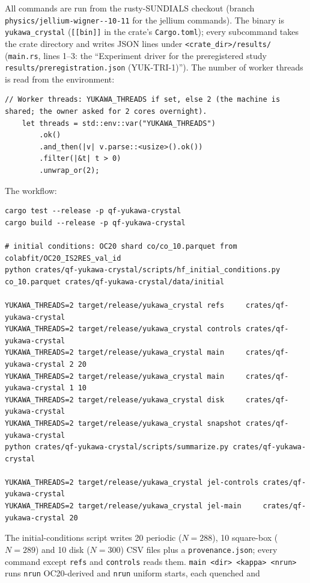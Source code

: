 All commands are run from the rusty-SUNDIALS checkout (branch \texttt{physics/\allowbreak jellium-\allowbreak wigner--10-11} for the jellium
commands). The binary is \texttt{yukawa\_crystal} (\texttt{[[bin]]} in the crate's \texttt{Cargo.toml}); every subcommand takes
the crate directory and writes JSON lines under \texttt{<crate\_dir>/results/} (\texttt{main.rs}, lines 1--3: the
``Experiment driver for the preregistered study \texttt{results/preregistration.json} (YUK-TRI-1)''). The number of worker threads is read from the environment:
\begin{lstlisting}[language={},title={main.rs, lines 260--265}]
    // Worker threads: YUKAWA_THREADS if set, else 2 (the machine is shared; the owner asked for 2 cores overnight).
    let threads = std::env::var("YUKAWA_THREADS")
        .ok()
        .and_then(|v| v.parse::<usize>().ok())
        .filter(|&t| t > 0)
        .unwrap_or(2);
\end{lstlisting}
The workflow:
\begin{lstlisting}[language={},title={Reproduction (one command per line; run from the repository root)}]
cargo test --release -p qf-yukawa-crystal
cargo build --release -p qf-yukawa-crystal

# initial conditions: OC20 shard co/co_10.parquet from colabfit/OC20_IS2RES_val_id
python crates/qf-yukawa-crystal/scripts/hf_initial_conditions.py co_10.parquet crates/qf-yukawa-crystal/data/initial

YUKAWA_THREADS=2 target/release/yukawa_crystal refs     crates/qf-yukawa-crystal
YUKAWA_THREADS=2 target/release/yukawa_crystal controls crates/qf-yukawa-crystal
YUKAWA_THREADS=2 target/release/yukawa_crystal main     crates/qf-yukawa-crystal 2 20
YUKAWA_THREADS=2 target/release/yukawa_crystal main     crates/qf-yukawa-crystal 1 10
YUKAWA_THREADS=2 target/release/yukawa_crystal disk     crates/qf-yukawa-crystal
YUKAWA_THREADS=2 target/release/yukawa_crystal snapshot crates/qf-yukawa-crystal
python crates/qf-yukawa-crystal/scripts/summarize.py crates/qf-yukawa-crystal

YUKAWA_THREADS=2 target/release/yukawa_crystal jel-controls crates/qf-yukawa-crystal
YUKAWA_THREADS=2 target/release/yukawa_crystal jel-main     crates/qf-yukawa-crystal 20
\end{lstlisting}
The initial-conditions script writes 20 periodic ($N=288$), 10 square-box ($N=289$) and 10 disk ($N=300$) CSV files
plus a \texttt{provenance.json}; every command except \texttt{refs} and \texttt{controls} reads them.
\texttt{main <dir> <kappa> <nrun>} runs \texttt{nrun} OC20-derived and \texttt{nrun} uniform starts, each quenched and
